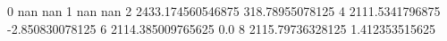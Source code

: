 0 nan nan
1 nan nan
2 2433.174560546875 318.78955078125
4 2111.5341796875 -2.850830078125
6 2114.385009765625 0.0
8 2115.79736328125 1.412353515625
